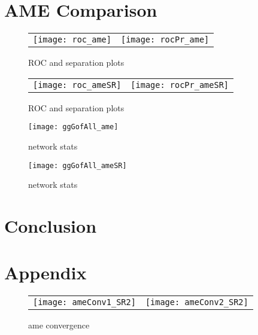 \section{AME Comparison}







\begin{figure}[ht]
	\centering
	\begin{tabular}{cc}
	\texttt{[image: roc\_ame]} & 
	\texttt{[image: rocPr\_ame]}
	\end{tabular}
	\caption{ROC and separation plots}
	\label{fig:roc_latentSpace}
\end{figure}



\begin{figure}[ht]
	\centering
	\begin{tabular}{cc}
	\texttt{[image: roc\_ameSR]} & 
	\texttt{[image: rocPr\_ameSR]}
	\end{tabular}
	\caption{ROC and separation plots}
	\label{fig:roc_latentSpace}
\end{figure}

\begin{figure}[ht]
	\centering
	\texttt{[image: ggGofAll\_ame]}
	\caption{network stats }
	\label{fig:gofAll_ame}
\end{figure}

\begin{figure}[ht]
	\centering
	\texttt{[image: ggGofAll\_ameSR]}
	\caption{network stats }
	\label{fig:gofAll_ameSR}
\end{figure}

\section{Conclusion}


\newpage
\section{Appendix}

\begin{figure}[ht]
	\centering
	\begin{tabular}{cc}
	\texttt{[image: ameConv1\_SR2]} &
	\texttt{[image: ameConv2\_SR2]}
	\end{tabular}
	\caption{ame convergence}
	\label{fig:ameConv}
\end{figure}
